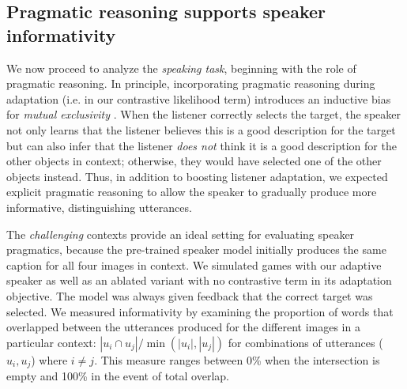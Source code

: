 \documentclass[11pt,a4paper]{article}
\begin{document}
\begin{table}[h!]
\caption{Examples of utterances produced by ablated speaker with pure cost penalty instead of data augmentation, which quickly become ungrammatical and incoherent.}
\label{tab:badbad_examples}
\end{table}


\subsection*{Pragmatic reasoning supports speaker informativity}
\label{sec:pragmatic_analysis}



We now proceed to analyze the \emph{speaking task}, beginning with the role of pragmatic reasoning.
In principle, incorporating pragmatic reasoning during adaptation (i.e. in our contrastive likelihood term) introduces an inductive bias for \emph{mutual exclusivity} \cite{SmithGoodmanFrank13_RecursivePragmaticReasoningNIPS, FrankGoodmanTenenbaum09_Wurwur,gandhi2019mutual}.
When the listener correctly selects the target, the speaker not only learns that the listener believes this is a good description for the target but can also infer that the listener \emph{does not} think it is a good description for the other objects in context; otherwise, they would have selected one of the other objects instead.
Thus, in addition to boosting listener adaptation, we expected explicit pragmatic reasoning to allow the speaker to gradually produce more informative, distinguishing utterances. 

The \emph{challenging} contexts provide an ideal setting for evaluating speaker pragmatics, because the pre-trained speaker model initially produces the same caption for all four images in context.
We simulated games with our adaptive speaker as well as an ablated variant with no contrastive term in its adaptation objective.
The model was always given feedback that the correct target was selected.
We measured informativity by examining the proportion of words that overlapped between the utterances produced for the different images in a particular context: $|u_i \cap u_j| / \min(|u_i|, |u_j|)$ for combinations of utterances ($u_i,u_j$) where $i \neq j$. 
This measure ranges between 0\% when the intersection is empty and 100\% in the event of total overlap. 
\end{document}
